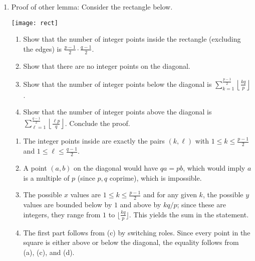 \documentclass[12pt]{amsart}
\newcommand{\solution}[1]{\ifthenelse {\equal{\displaysol}{1}} {\begin{framed}{\color{meretale}\noindent #1}\end{framed}} { \ }}
\begin{document}
\begin{enumerate}
\item Proof of other lemma: Consider the rectangle below.
\begin{center}
\texttt{[image: rect]}
\end{center}
\begin{enumerate}
\item Show that the number of integer points inside the rectangle (excluding the edges) is $\frac{p-1}{2} \cdot \frac{q-1}{2}$.
\item Show that there are no integer points on the diagonal.
\item Show that the number of integer points below the diagonal is $\sum_{k=1}^{\frac{p-1}{2}} \left \lfloor \frac{kq}{p} \right\rfloor$.
\item Show that the number of integer points above the diagonal is $ \sum_{\ell=1}^{\frac{q-1}{2}} \left \lfloor \frac{\ell p}{q} \right\rfloor$. Conclude the proof.
\end{enumerate}
\solution{
\begin{enumerate}
\item The integer points inside are exactly the pairs $(k,\ell)$ with $1\leq k \leq \frac{p-1}{2}$ and $1\leq \ell \leq \frac{q-1}{2}$.
\item A point $(a,b)$ on the diagonal would have $qa=pb$, which would imply $a$ is a multiple of $p$ (since $p,q$ coprime), which is impossible.
\item The possible $x$ values are $1\leq k \leq \frac{p-1}{2}$ and for any given $k$, the possible $y$ values are bounded below by $1$ and above by $kq/p$; since these are integers, they range from $1$ to $\lfloor \frac{kq}{p} \rfloor$. This yields the sum in the statement.
\item The first part follows from (c) by switching roles. Since every point in the square is either above or below the diagonal, the equality follows from (a), (c), and (d).
\end{enumerate}
}


\end{enumerate}
\end{document}
